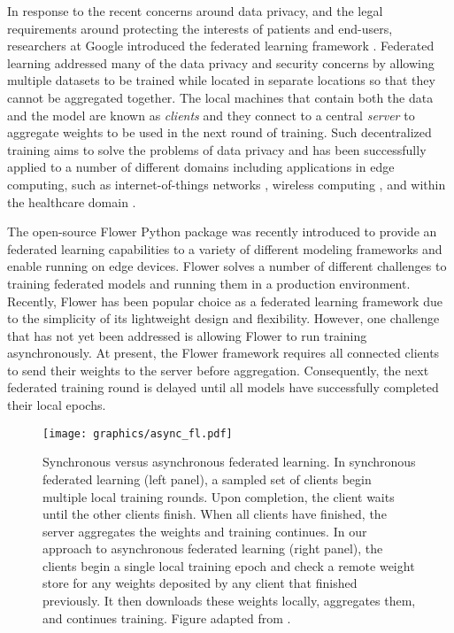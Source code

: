 \documentclass[twocolumn, switch]{article} %
\begin{document}
In response to the recent concerns around data privacy, and the legal requirements around protecting the interests of patients and end-users, researchers at Google introduced the federated learning framework \cite{fed_1, fed_2}. Federated learning addressed many of the data privacy and security concerns by allowing multiple datasets to be trained while located in separate locations so that they cannot be aggregated together. The local machines that contain both the data and the model are known as \textit{clients} and they connect to a central \textit{server} to aggregate weights to be used in the next round of training. Such decentralized training aims to solve the problems of data privacy and has been successfully applied to a number of different domains including applications in edge computing, such as internet-of-things networks \cite{fed_iot}, wireless computing \cite{fed_wireless}, and within the healthcare domain \cite{fed_healthcare}. 

The open-source Flower Python package \cite{flower} was recently introduced to provide an federated learning capabilities to a variety of different modeling frameworks and enable running on edge devices. Flower solves a number of different challenges to training federated models and running them in a production environment. Recently, Flower has been popular choice as a federated learning framework due to the simplicity of its lightweight design and flexibility. However, one challenge that has not yet been addressed is allowing Flower to run training asynchronously. At present, the Flower framework requires all connected clients to send their weights to the server before aggregation. Consequently, the next federated training round is delayed until all models have successfully completed their local epochs.

\begin{figure*}
    \centering
    \texttt{[image: graphics/async\_fl.pdf]}
    \caption{Synchronous versus asynchronous federated learning. In synchronous federated learning (left panel), a sampled set of clients begin multiple local training rounds. Upon completion, the client waits until the other clients finish. When all clients have finished, the server aggregates the weights and training continues. In our approach to asynchronous federated learning (right panel), the clients begin a single local training epoch and check a remote weight store for any weights deposited by any client that finished previously. It then downloads these weights locally, aggregates them, and continues training. Figure adapted from \cite{fed_async1}.}
    \label{fig:syncasync}
\end{figure*}
\end{document}
